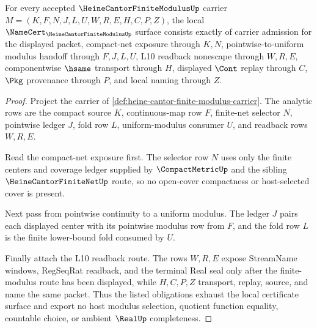 \begin{theorem}
\label{thm:heine-cantor-finite-modulus-namecert-obligations}
For every accepted $\HeineCantorFiniteModulusUp$ carrier $M=(K,F,N,J,L,U,W,R,E,H,C,P,Z)$, the local $\NameCert_{\HeineCantorFiniteModulusUp}$ surface consists exactly of carrier admission for the displayed packet, compact-net exposure through $K,N$, pointwise-to-uniform modulus handoff through $F,J,L,U$, L10 readback nonescape through $W,R,E$, componentwise $\hsame$ transport through $H$, displayed $\Cont$ replay through $C$, $\Pkg$ provenance through $P$, and local naming through $Z$.
\end{theorem}
\begin{proof}
Project the carrier of \autoref{def:heine-cantor-finite-modulus-carrier}. The analytic rows are the compact source $K$, continuous-map row $F$, finite-net selector $N$, pointwise ledger $J$, fold row $L$, uniform-modulus consumer $U$, and readback rows $W,R,E$.

Read the compact-net exposure first. The selector row $N$ uses only the finite centers and coverage ledger supplied by $\CompactMetricUp$ and the sibling $\HeineCantorFiniteNetUp$ route, so no open-cover compactness or host-selected cover is present.

Next pass from pointwise continuity to a uniform modulus. The ledger $J$ pairs each displayed center with its pointwise modulus row from $F$, and the fold row $L$ is the finite lower-bound fold consumed by $U$.

Finally attach the L10 readback route. The rows $W,R,E$ expose StreamName windows, RegSeqRat readback, and the terminal Real seal only after the finite-modulus route has been displayed, while $H,C,P,Z$ transport, replay, source, and name the same packet. Thus the listed obligations exhaust the local certificate surface and export no host modulus selection, quotient function equality, countable choice, or ambient $\RealUp$ completeness.
\end{proof}


